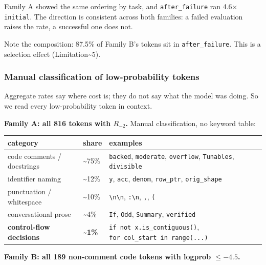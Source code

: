 \documentclass[
  11pt,
]{article}
\begin{document}
Family A showed the same ordering by task, and \texttt{after\_failure}
ran 4.6× \texttt{initial}. The direction is consistent across both
families: a failed evaluation raises the rate, a successful one does
not.

Note the composition: 87.5\% of Family B's tokens sit in
\texttt{after\_failure}. This is a selection effect
(Limitation\textasciitilde5).

\hypertarget{manual-classification-of-low-probability-tokens}{%
\subsubsection{Manual classification of low-probability
tokens}\label{manual-classification-of-low-probability-tokens}}

Aggregate rates say where cost is; they do not say what the model was
doing. So we read every low-probability token in context.

\textbf{Family A: all 816 tokens with \(R_{-2}\).} Manual
classification, no keyword table:

\begin{longtable}[]{@{}
  >{\raggedright\arraybackslash}p{}
  >{\raggedright\arraybackslash}p{}
  >{\raggedright\arraybackslash}p{}@{}}
\toprule
category & share & examples \\
\midrule
\endhead
code comments / docstrings & \textasciitilde75\% & \texttt{backed},
\texttt{moderate}, \texttt{overflow}, \texttt{Tunables},
\texttt{divisible} \\
identifier naming & \textasciitilde12\% & \texttt{y}, \texttt{acc},
\texttt{denom}, \texttt{row\_ptr}, \texttt{orig\_shape} \\
punctuation / whitespace & \textasciitilde10\% &
\texttt{\textbackslash{}n\textbackslash{}n},
\texttt{:\textbackslash{}n}, \texttt{,}, \texttt{(} \\
conversational prose & \textasciitilde4\% & \texttt{If}, \texttt{Odd},
\texttt{Summary}, \texttt{verified} \\
\textbf{control-flow decisions} & \textbf{\textasciitilde1\%} &
\texttt{if\ not\ x.is\_contiguous()},
\texttt{for\ col\_start\ in\ range(...)} \\
\bottomrule
\end{longtable}

\textbf{Family B: all 189 non-comment code tokens with logprob
\(\le -4.5\).}
\end{document}
